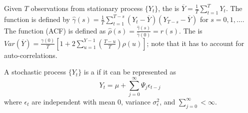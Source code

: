 Given $T$ observations from stationary process $\{Y_t\}$, the  is $\overline{Y} = \frac{1}{T} \sum\limits_{t=1}^T Y_t$. The  function is defined by $\hat{\gamma}(s) = \frac{1}{T} \sum\limits_{t=1}^{T-s} (Y_t - \overline{Y})(Y_{T-s} - \overline{Y})$ for $s=0, 1, \ldots$. The  function (ACF) is defined as $\hat{\rho}(s) = \frac{\hat{\gamma}(s)}{\hat{\gamma}(0)} = r(s)$. The  is $Var(\overline{Y}) = \frac{\gamma(0)}{T}\left[1 + 2 \sum\limits_{u=1}^{Y-1} \left(\frac{T-u}{T} \right) \rho(u) \right]$; note that it has to account for auto-correlations.

\begin{definition} A stochastic process $\{Y_t\}$ is a  if it can be represented as
\begin{equation*}
Y_t = \mu + \sum\limits_{j=0}^{\infty} \Psi_j \epsilon_{t-j} \nonumber
\end{equation*}
where $\epsilon_t$ are independent with mean $0$, variance $\sigma_{\epsilon}^2$, and $\sum\limits_{j=0}^{\infty} < \infty$.
\end{definition}
